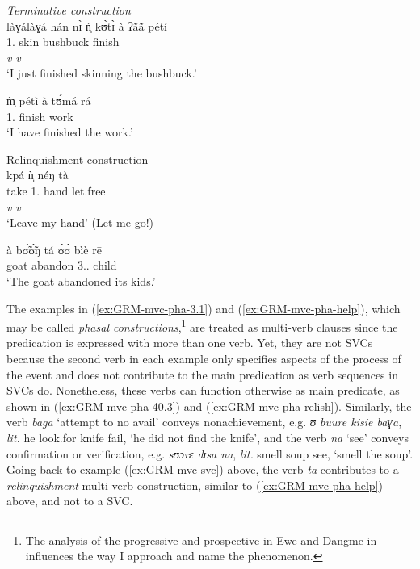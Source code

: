 \ea\label{ex:GRM-mvc-phase}

\ea\label{ex:GRM-mvc-pha-3.1} {\it Terminative construction} \\
\glll làɣálàɣá hán nɪ̀ ǹ̩ kʊ̀tɪ̀ à ʔã́ã́ pétí\\
{\advt} {\dem} {\postp} {1.\sg} {skin} {\art} bushbuck  finish\\
{} {} {} {}  {\it v} {} {} {\it v} \\
\glt `I  just finished skinning the bushbuck.'

\ex\label{ex:GRM-mvc-pha-40.3}
\gll  m̩̀ pétì à tʊ́má rá \\
{1.\sg} finish {\art} work {\foc}\\
\glt `I have finished the work.'


\ex\label{ex:GRM-mvc-pha-help}{\rm Relinquishment construction}\\
\glll  kpá ǹ̩ néŋ tà \\
take {1.\sg} hand let.free\\
 {\it v} {}  {} {\it v} \\
\glt `Leave my hand' (Let me go!)

\ex\label{ex:GRM-mvc-pha-relish} 
\gll  à bʊ̃́ʊ̃́ŋ tá ʊ̀ʊ̀ bìè rē \\
{\art} goat abandon {3.\sg.\poss} child {\foc}\\
\glt `The goat abandoned its kids.'

\z 
 \z

The examples  in (\ref{ex:GRM-mvc-pha-3.1}) and (\ref{ex:GRM-mvc-pha-help}),
which may be called  {\it phasal  constructions},\footnote{The analysis of the
progressive and prospective in Ewe and Dangme in \citet{Amek08} influences the
way I approach and name the phenomenon.}  are treated as multi-verb clauses
since the predication is expressed with more than one verb. Yet, they are not
SVCs because the second verb in each example only specifies aspects of the
process
of the event  and does not contribute to the main predication as verb sequences
in SVCs do. Nonetheless, these verbs can function otherwise as main predicate,
as shown in (\ref{ex:GRM-mvc-pha-40.3}) and (\ref{ex:GRM-mvc-pha-relish}).
Similarly, the verb {\it baga} `attempt to no avail'  conveys
nonachievement, e.g. {\it ʊ buure kisie baɣa}, {\it lit.} he look.for knife 
fail,
`he did not find the knife',  and the verb {\it na} `see' conveys confirmation 
or
verification, e.g. {\it sʊɔrɛ dɪsa na}, {\it lit.} smell soup see, `smell the
soup'. Going back to example (\ref{ex:GRM-mvc-svc}) above, the verb {\it ta}
contributes to a {\it relinquishment} multi-verb construction, similar to
(\ref{ex:GRM-mvc-pha-help}) above, and not to a SVC. 
 
